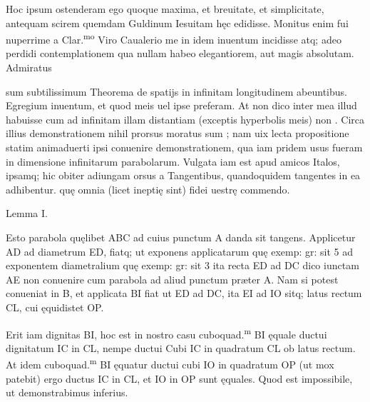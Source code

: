 \documentclass[11pt,a4paper]{article}
\begin{document}
Hoc ipsum ostenderam ego quoque maxima, et breuitate, et simplicitate, antequam scirem quemdam Guldinum Iesuitam hęc edidisse. Monitus enim fui nuperrime a Clar.\textsuperscript{mo} Viro Caualerio me in idem inuentum incidisse atq; adeo perdidi contemplationem qua nullam habeo elegantiorem, aut magis absolutam. Admiratus


sum subtilissimum Theorema de spatijs in infinitam longitudinem abeuntibus. Egregium inuentum, et quod  meis uel ipse preferam. At non dico inter mea illud habuisse cum ad infinitam illam distantiam (exceptis hyperbolis meis) non . Circa illius demonstrationem nihil prorsus moratus sum ; nam uix lecta propositione statim animaduerti ipsi conuenire demonstrationem, qua iam pridem usus fueram in dimensione infinitarum parabolarum. Vulgata iam est apud amicos Italos, ipsamq; hic obiter adiungam orsus a Tangentibus, quandoquidem tangentes in ea adhibentur. quę omnia (licet ineptię sint) fidei uestrę commendo.

Lemma I.

Esto parabola quęlibet ABC ad cuius punctum A danda sit tangens. Applicetur AD ad diametrum ED, fiatq; ut exponens applicatarum quę exemp: gr: sit 5 ad exponentem diametralium quę exemp: gr: sit 3 ita recta ED ad DC dico iunctam AE non conuenire cum parabola ad aliud punctum præter A. Nam si potest conueniat in B, et applicata BI fiat ut ED ad DC, ita EI ad IO sitq; latus rectum CL, cui ęquidistet OP.

Erit iam dignitas BI, hoc est in nostro casu cuboquad.\textsuperscript{m} BI ęquale ductui dignitatum IC in CL, nempe ductui Cubi IC in quadratum CL ob latus rectum. At idem cuboquad.\textsuperscript{m} BI ęquatur ductui cubi IO in quadratum OP (ut mox patebit) ergo ductus IC in CL, et IO in OP sunt ęquales. Quod est impossibile, ut demonstrabimus inferius.
\end{document}

